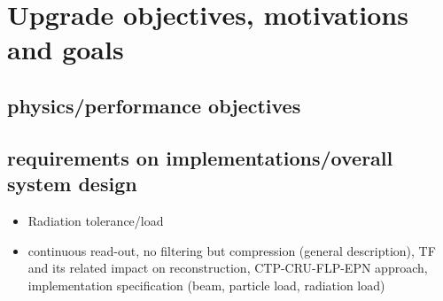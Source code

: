 \section{Upgrade objectives, motivations and goals}
\subsection{physics/performance objectives}
\subsection{requirements on implementations/overall system design}
\begin{itemize}
\item Radiation tolerance/load
\item continuous read-out, no filtering but compression (general description), TF and its related impact on reconstruction, CTP-CRU-FLP-EPN approach, implementation specification (beam, particle load, radiation load)
\end{itemize}
